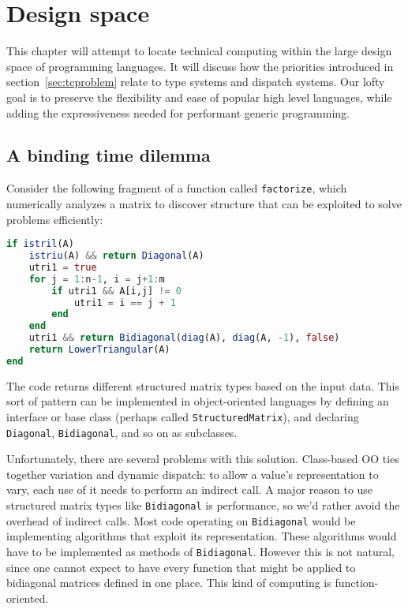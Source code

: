 \chapter{Design space}


This chapter will attempt to locate technical computing within the large
design space of programming languages.
It will discuss how the priorities introduced in section~\ref{sec:tcproblem}
relate to type systems and dispatch systems.
Our lofty goal is to preserve the flexibility and ease of popular high level
languages, while adding the expressiveness needed for performant generic
programming.


\section{A binding time dilemma}

Consider the following fragment of a function called \texttt{factorize},
which numerically analyzes a matrix to discover structure that
can be exploited to solve problems efficiently:

\begin{singlespace}
\begin{lstlisting}[language=julia]
if istril(A)
    istriu(A) && return Diagonal(A)
    utri1 = true
    for j = 1:n-1, i = j+1:m
        if utri1 && A[i,j] != 0
            utri1 = i == j + 1
        end
    end
    utri1 && return Bidiagonal(diag(A), diag(A, -1), false)
    return LowerTriangular(A)
end
\end{lstlisting}
\end{singlespace}

\noindent
The code returns different structured matrix types based on the input
data.
This sort of pattern can be implemented in object-oriented languages
by defining an interface or base class (perhaps called \texttt{StructuredMatrix}),
and declaring \texttt{Diagonal}, \texttt{Bidiagonal}, and so on as
subclasses.

Unfortunately, there are several problems with this solution.
Class-based OO ties together variation and dynamic dispatch: to allow
a value's representation to vary, each use of it needs to perform an
indirect call.
A major reason to use structured matrix types like \texttt{Bidiagonal}
is performance, so we'd rather avoid the overhead of indirect calls.
Most code operating on \texttt{Bidiagonal} would
be implementing algorithms that exploit its representation.
These algorithms would have to be implemented as methods of
\texttt{Bidiagonal}.
However this is not natural, since one cannot expect to have every
function that might be applied to bidiagonal matrices defined in
one place.
This kind of computing is function-oriented.

